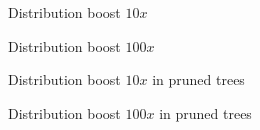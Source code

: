 \documentclass[a4paper]{article}
\begin{document}
\newpage
\fancyhfoffset[R]{0pt}
\fancyhfoffset[L]{0pt}
\begin{landscape}
\begin{figure}
	\centering
	\label{Recap}
\end{figure}	
\end{landscape}


\newpage
{}
\fancyhfoffset[R]{-50pt}
\fancyhfoffset[L]{-50pt}
\begin{figure}[h]
	\centering
	\caption{Distribution boost $10x$}
	\label{Boost 10}
\end{figure}

\begin{figure}[h]
	\centering
	\caption{Distribution boost $100x$}
	\label{Boost 100}
\end{figure}
\newpage
\begin{figure}[h]
	\centering
	\caption{Distribution boost $10x$ in pruned trees}
	\label{Boost 10 pruned}
\end{figure}

\begin{figure}[h]
	\centering
	\caption{Distribution boost $100x$ in pruned trees}
	\label{Boost 100 pruned}
\end{figure}
\restoregeometry
\end{document}

